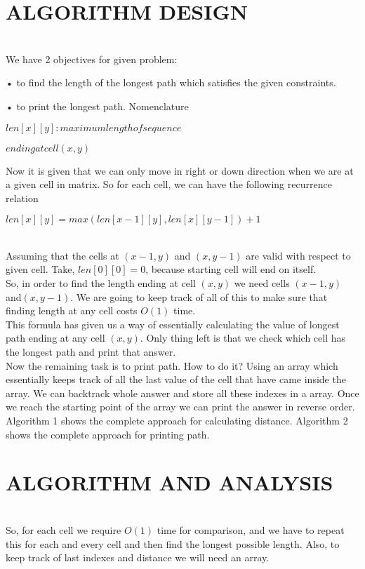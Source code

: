 \documentclass[conference]{IEEEtran}
\begin{document}
\section{ALGORITHM DESIGN}\\

We have 2 objectives for given problem:

• to find the length of the longest path which satisfies the
given constraints.

• to print the longest path.
Nomenclature
\begin{center}
  $len[x][y] : maximum length of sequence$  
\end{center}
\begin{center}
  $ending at cell (x, y)$  
\end{center}

Now it is given that we can only move in right or down
direction when we are at a given cell in matrix. So for each
cell, we can have the following recurrence relation
\begin{center}
 $len[x][y] = max(len[x − 1][y], len[x][y − 1]) + 1$
\end{center}

\\
Assuming that the cells at $(x-1, y)$ and $(x, y-1)$ are valid with
respect to given cell. Take, $len[0][0] = 0$, because starting cell
will end on itself.\\
  So, in order to find the length ending at cell $(x, y)$ we need
cells $(x-1, y)$ and$(x, y-1)$. We are going to keep track of all
of this to make sure that finding length at any cell costs $O(1)$
time.\\
This formula has given us a way of essentially calculating
the value of longest path ending at any cell $(x, y)$. Only thing
left is that we check which cell has the longest path and print
that answer.\\
Now the remaining task is to print path. How to do it?
Using an array which essentially keeps track of all the last
value of the cell that have came inside the array. We can
backtrack whole answer and store all these indexes in a array.
Once we reach the starting point of the array we can print the
answer in reverse order.\\
Algorithm 1 shows the complete approach for calculating
distance. Algorithm 2 shows the complete approach for
printing path.

\section{ALGORITHM AND ANALYSIS}\\
So, for each cell we require $O(1)$ time for comparison, and
we have to repeat this for each and every cell and then find
the longest possible length. Also, to keep track of last indexes
and distance we will need an array.
\end{document}
